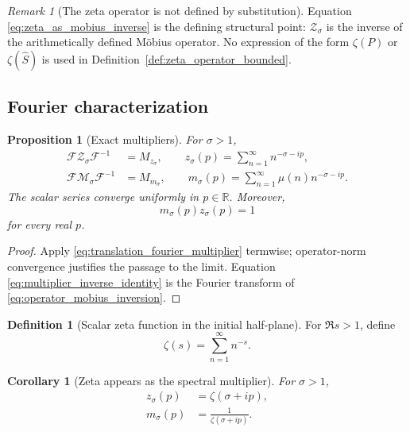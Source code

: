 \documentclass[11pt]{amsart}
\numberwithin{equation}{section}
\theoremstyle{plain}
\newtheorem{proposition}[theorem]{Proposition}
\newtheorem{corollary}[theorem]{Corollary}
\theoremstyle{definition}
\newtheorem{definition}[theorem]{Definition}
\theoremstyle{remark}
\newtheorem{remark}[theorem]{Remark}
\newcommand{\R}{\mathbb{R}}
\newcommand{\Four}{\mathcal{F}}
\begin{document}
\begin{remark}[The zeta operator is not defined by substitution]
\label{rem:not_zeta_of_operator}
Equation \eqref{eq:zeta_as_mobius_inverse} is the defining structural point:
$\mathcal Z_\sigma$ is the inverse of the arithmetically defined M\"obius
operator.  No expression of the form $\zeta(P)$ or $\zeta(\widehat S)$ is
used in Definition~\ref{def:zeta_operator_bounded}.
\end{remark}

\subsection{Fourier characterization}
\label{subsec:fourier_characterization}

\begin{proposition}[Exact multipliers]
\label{prop:bounded_fourier_multipliers}
For $\sigma>1$,
\begin{align}
\Four\mathcal Z_\sigma\Four^{-1}
&=M_{z_\sigma},
\qquad
z_\sigma(p)=\sum_{n=1}^{\infty}n^{-\sigma-ip},
\label{eq:zeta_multiplier_series}\\
\Four\mathcal M_\sigma\Four^{-1}
&=M_{m_\sigma},
\qquad
m_\sigma(p)=\sum_{n=1}^{\infty}\mu(n)n^{-\sigma-ip}.
\label{eq:mobius_multiplier_series}
\end{align}
The scalar series converge uniformly in $p\in\R$.  Moreover,
\begin{equation}
m_\sigma(p)z_\sigma(p)=1
\label{eq:multiplier_inverse_identity}
\end{equation}
for every real $p$.
\end{proposition}

\begin{proof}
Apply \eqref{eq:translation_fourier_multiplier} termwise; operator-norm
convergence justifies the passage to the limit.  Equation
\eqref{eq:multiplier_inverse_identity} is the Fourier transform of
\eqref{eq:operator_mobius_inversion}.
\end{proof}

\begin{definition}[Scalar zeta function in the initial half-plane]
\label{def:scalar_zeta_initial}
For $\Re s>1$, define
\begin{equation}
\zeta(s)=\sum_{n=1}^{\infty}n^{-s}.
\label{eq:scalar_zeta_dirichlet}
\end{equation}
\end{definition}

\begin{corollary}[Zeta appears as the spectral multiplier]
\label{cor:zeta_as_multiplier}
For $\sigma>1$,
\begin{align}
z_\sigma(p)
&=\zeta(\sigma+ip),
\label{eq:zeta_multiplier_identification}\\
m_\sigma(p)
&=\frac{1}{\zeta(\sigma+ip)}.
\label{eq:mobius_multiplier_identification}
\end{align}
\end{corollary}
\end{document}
